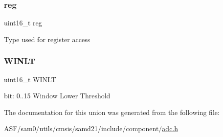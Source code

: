\subsubsection{\texorpdfstring{reg}{reg}}
{\footnotesize\ttfamily uint16\+\_\+t reg}

Type used for register access \mbox{\label{union_a_d_c___w_i_n_l_t___type_a31b9ac92e34b3979fa6c52c114197af0}} 
\subsubsection{\texorpdfstring{WINLT}{WINLT}}
{\footnotesize\ttfamily uint16\+\_\+t W\+I\+N\+LT}

bit\+: 0..15 Window Lower Threshold 

The documentation for this union was generated from the following file\+:\begin{DoxyCompactItemize}
\item 
A\+S\+F/sam0/utils/cmsis/samd21/include/component/\mbox{\hyperlink{component_2adc_8h}{adc.\+h}}\end{DoxyCompactItemize}
